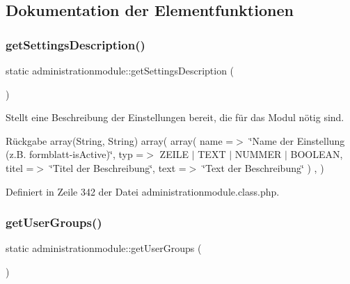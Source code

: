 \subsection{Dokumentation der Elementfunktionen}
\mbox{\label{classadministrationmodule_ab1155eaf2fecbdd7e5be823a1577f97e}} 
\subsubsection{\texorpdfstring{get\+Settings\+Description()}{getSettingsDescription()}}
{\footnotesize\ttfamily static administrationmodule\+::get\+Settings\+Description (\begin{DoxyParamCaption}{ }\end{DoxyParamCaption})\hspace{0.3cm}{\ttfamily [static]}}

Stellt eine Beschreibung der Einstellungen bereit, die für das Modul nötig sind. \begin{DoxyReturn}{Rückgabe}
array(\+String, String) array( array( \textquotesingle{}name\textquotesingle{} =$>$ \char`\"{}\+Name der Einstellung (z.\+B. formblatt-\/is\+Active)\char`\"{}, \textquotesingle{}typ\textquotesingle{} =$>$ Z\+E\+I\+LE $\vert$ T\+E\+XT $\vert$ N\+U\+M\+M\+ER $\vert$ B\+O\+O\+L\+E\+AN, \textquotesingle{}titel\textquotesingle{} =$>$ \char`\"{}\+Titel der Beschreibung\char`\"{}, \textquotesingle{}text\textquotesingle{} =$>$ \char`\"{}\+Text der Beschreibung\char`\"{} ) , ) 
\end{DoxyReturn}


Definiert in Zeile 342 der Datei administrationmodule.\+class.\+php.

\mbox{\label{classadministrationmodule_a3385151fee17c9aa7cb6c16f50d28d10}} 
\subsubsection{\texorpdfstring{get\+User\+Groups()}{getUserGroups()}}
{\footnotesize\ttfamily static administrationmodule\+::get\+User\+Groups (\begin{DoxyParamCaption}{ }\end{DoxyParamCaption})\hspace{0.3cm}{\ttfamily [static]}}

